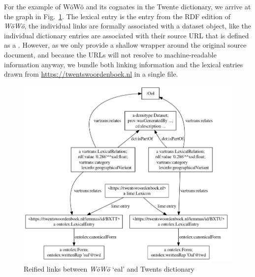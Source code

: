 For the example of WöWö  and its cognates in the Twente dictionary, we arrive at the graph in Fig.\ \ref{fig-links}. The lexical entry  is the entry from the RDF edition of \emph{WöWö}, the individual links are formally associated with a dataset object, like the individual dictionary entries are associated with their source URL that is defined as a . However, as we only provide a shallow wrapper around the original source document, and because the URLs will not resolve to machine-readable information anyway, we bundle both linking information and the lexical entries drawn from \url{https://twentswoordenboek.nl} in a single file.

\begin{figure}
    \centering
    \includegraphics[width=1.05\linewidth]{img/links-vis.png}
    \caption{Reified  links between \emph{WöWö}  `eal' and Twents dictionary}
    \label{fig-links}
\end{figure}

